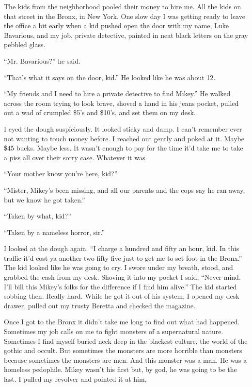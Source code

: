 The kids from the neighborhood pooled their money to hire me. All
the kids on that street in the Bronx, in New York. One slow day I
was getting ready to leave the office a bit early when a kid pushed
open the door with my name, Luke Bavarious, and my job, private
detective, painted in neat black letters on the gray pebbled
glass.



``Mr. Bavarious?'' he said.

``That's what it says on the door, kid.'' He looked
like he was about 12.

``My friends and I need to hire a private detective to find
Mikey.'' He walked across the room trying to look brave,
shoved a hand in his jeans pocket, pulled out a wad of crumpled
\$5's and \$10's, and set them on my desk.



I eyed the dough suspiciously. It looked sticky and damp. I
can't remember ever not wanting to touch money before. I
reached out gently and poked at it. Maybe \$45 bucks. Maybe less. It
wasn't enough to pay for the time it'd take me to take
a piss all over their sorry case. Whatever it was.



``Your mother know you're here, kid?''

``Mister, Mikey's been missing, and all our parents and
the cops say he ran away, but we know he got taken.''

``Taken by what, kid?''

``Taken by a nameless horror, sir.''



I looked at the dough again. ``I charge a hundred and fifty an
hour, kid. In this traffic it'd cost ya another two fifty
five just to get me to set foot in the Bronx.'' The kid looked
like he was going to cry. I swore under my breath, stood, and
grabbed the cash from my desk. Shoving it into my pocket I said,
``Never mind. I'll bill this Mikey's folks for the
difference if I find him alive.'' The kid started sobbing
then. Really hard. While he got it out of his system, I opened my
desk drawer, pulled out my trusty Beretta and checked the
magazine.



Once I got to the Bronx it didn't take me long to find out
what had happened. Sometimes my job calls on me to fight monsters
of a supernatural nature. Sometimes I find myself buried neck deep
in the blackest culture, the world of the gothic and occult. But
sometimes the monsters are more horrible than monsters because
sometimes the monsters are men. And this monster was a man. He was
a homeless pedophile. Mikey wasn't his first but, by god, he
was going to be the last. I pulled my revolver and pointed it at
him,



